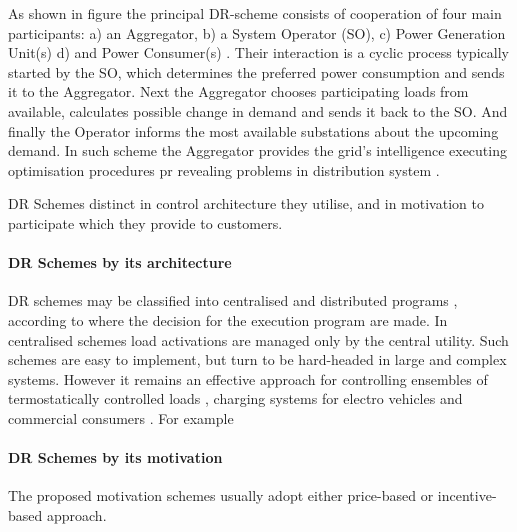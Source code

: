 As shown in figure  the principal DR-scheme consists of cooperation of four main participants: a) an Aggregator, b) a System Operator (SO), c) Power Generation Unit(s) d) and Power Consumer(s) \cite{Medina2010}. Their interaction is a cyclic process typically started by the SO, which determines the preferred power consumption and sends it to the Aggregator. Next the Aggregator chooses participating loads from available, calculates possible change in demand and sends it back to the SO. And finally the Operator informs the most available substations about the upcoming demand. In such scheme the Aggregator provides the grid's intelligence executing optimisation procedures pr revealing problems in distribution system \cite{Vardakas2015}. 

DR Schemes distinct in control architecture they utilise, and in motivation to participate which they provide to customers.

\paragraph{DR Schemes by its architecture} DR schemes may be classified into centralised and distributed programs \cite{Zhou2012}, according to where the decision for the execution program are made. In centralised schemes load activations are managed only by the central utility. Such schemes are easy to implement, but turn to be hard-headed in large and complex systems. However it remains an effective approach for controlling ensembles of termostatically controlled loads \cite{Hao2015}, charging systems for electro vehicles \cite{Yano2012} and commercial consumers \cite{Motegi2007}. For example 


\paragraph{DR Schemes by its motivation}
The proposed motivation schemes usually adopt either price-based or incentive-based approach. 



